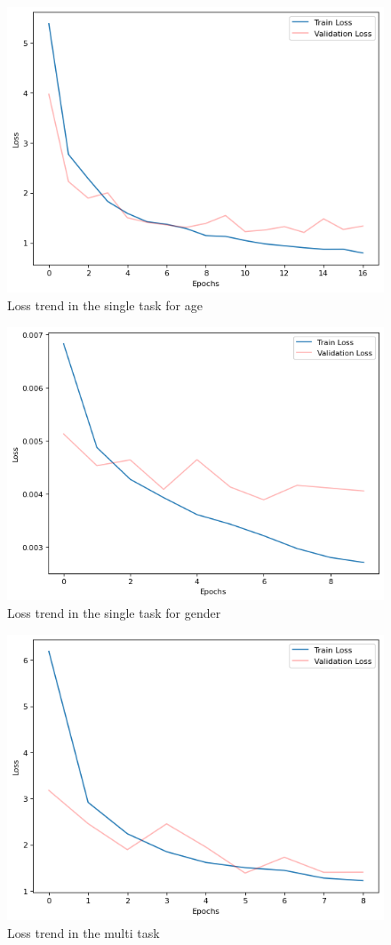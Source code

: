 \begin{figure}[htbp]
    \centerline{\includegraphics[width=.5\textwidth]{images/training/loss-single-age.png}}
    \caption{Loss trend in the single task for age}
    \label{1loss}
\end{figure}
\begin{figure}[htbp]
    \centerline{\includegraphics[width=.5\textwidth]{images/training/loss-single-gender.png}}
    \caption{Loss trend in the single task for gender}
    \label{2loss}
\end{figure}
\begin{figure}[htbp]
    \centerline{\includegraphics[width=.5\textwidth]{images/training/loss-multi.png}}
    \caption{Loss trend in the multi task}
    \label{3loss}
\end{figure}

